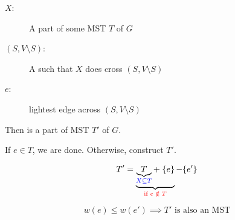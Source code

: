 \begin{frame}{}
\end{frame}

\begin{frame}{}
  \begin{theorem}
    \begin{description}
      \item[$X:$] A part of some MST $T$ of $G$
      \item[$(S, V \setminus S):$] A  such that $X$ does  cross $(S, V \setminus S)$
    ­  \item[$e:$]  lightest edge across $(S, V \setminus S)$
    \end{description}

    \begin{center}
      {Then  is a part of  MST $T'$ of $G$.}
    \end{center}
  \end{theorem}

  \pause
  \vspace{0.60cm}
  \begin{center}
    {}
  \end{center}
\end{frame}

\begin{frame}{}
  \begin{center}
    {}
  \end{center}

  \pause

  \pause
  \begin{center}
    If $e \in T$, we are done. \pause Otherwise, construct $T'$.
  \end{center}

  \pause
  \[
    T' = \underbrace{\underbrace{T}_{\textcolor{blue}{X \subseteq T}} +\; \{e\}}_{\textcolor{red}{\text{if } e \;\notin\; T}} - \{e'\}
  \]

  \pause
  \[
    w(e) \le w(e') \implies T' \text{ is also an MST}
  \]
\end{frame}

